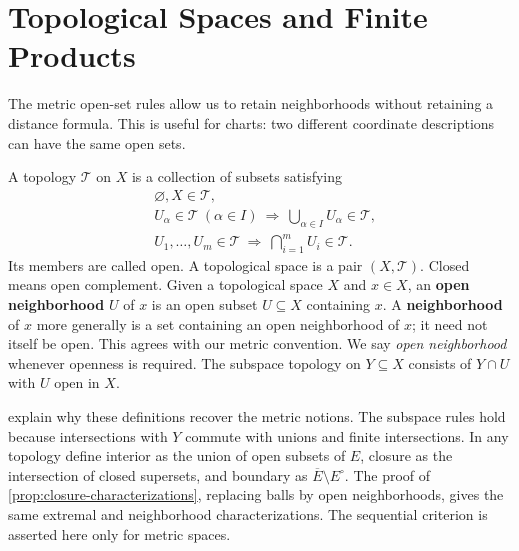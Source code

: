 \section{Topological Spaces and Finite Products}
The metric open-set rules allow us to retain neighborhoods without retaining
a distance formula. This is useful for charts: two different coordinate
descriptions can have the same open sets.
\begin{definition}\label{def:topology-neighborhood}
A topology $\mathcal T$ on $X$ is a collection of subsets satisfying
\begin{align*}
&\varnothing,X\in\mathcal T,\\
&U_\alpha\in\mathcal T\ (\alpha\in I)\ \Longrightarrow\ \bigcup_{\alpha\in I}U_\alpha\in\mathcal T,\\
&U_1,\ldots,U_m\in\mathcal T\ \Longrightarrow\ \bigcap_{i=1}^mU_i\in\mathcal T.
\end{align*}
Its members are called open. A topological space is a pair $(X,\mathcal T)$.
Closed means open complement. Given a topological space $X$ and $x\in X$,
an \textbf{open neighborhood} $U$ of $x$ is an open subset $U\subseteq X$
containing $x$. A \textbf{neighborhood} of $x$ more generally is a set
containing an open neighborhood of $x$; it need not itself be open. This
agrees with our metric convention. We say \emph{open neighborhood} whenever
openness is required. The subspace topology on $Y\subseteq X$ consists of $Y\cap U$
with $U$ open in $X$.
\end{definition}
 explain why these definitions
recover the metric notions. The subspace rules hold because intersections
with $Y$ commute with unions and finite intersections. In any topology define
interior as the union of open subsets of $E$, closure as the intersection of
closed supersets, and boundary as $\overline E\setminus E^\circ$.
The proof of \cref{prop:closure-characterizations}, replacing balls by open
neighborhoods, gives the same extremal and neighborhood characterizations.
The sequential criterion is asserted here only for metric spaces.

